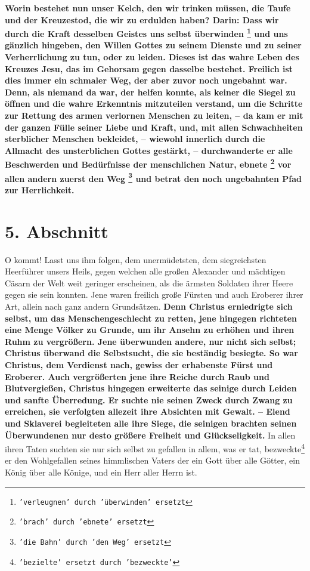 \label{ref:04_04_kelch_taufe_kreuz}
 
\textbf{Worin bestehet nun unser Kelch, den wir trinken müssen, die Taufe und
der
Kreuzestod, die wir zu erdulden haben? Darin: Dass wir durch die Kraft desselben
Geistes uns selbst überwinden \footnote{\texttt{'verleugnen' durch 'überwinden'
ersetzt}} und uns gänzlich hingeben, den Willen Gottes zu
seinem Dienste und zu seiner Verherrlichung zu tun, oder zu leiden. Dieses ist
das wahre Leben des Kreuzes Jesu, das im Gehorsam gegen dasselbe bestehet.
Freilich ist dies immer ein schmaler Weg, der aber zuvor noch ungebahnt war. Denn, als
niemand da war, der helfen konnte, als keiner die Siegel  zu
öffnen und die wahre
Erkenntnis mitzuteilen verstand, um die Schritte zur Rettung des armen
verlornen Menschen zu leiten, -- da kam er mit der ganzen Fülle seiner Liebe und
Kraft, und, mit allen Schwachheiten sterblicher Menschen bekleidet, -- wiewohl
innerlich durch die Allmacht  des unsterblichen Gottes
gestärkt, -- durchwanderte
er alle Beschwerden und Bedürfnisse der menschlichen Natur, ebnete
\footnote{\texttt{'brach' durch 'ebnete' ersetzt}} vor allen
andern zuerst den Weg \footnote{\texttt{'die Bahn' durch 'den Weg' ersetzt}} und
betrat den noch ungebahnten Pfad zur Herrlichkeit.}

\section{5. Abschnitt} \label{kap4_ab5}

\label{ref:04_05_besigen}
O kommt! Lasst uns ihm folgen, dem unermüdetsten, dem siegreichsten Heerführer
unsers Heils, gegen welchen alle großen Alexander 
und mächtigen Cäsarn der Welt 
weit geringer erscheinen, als die ärmsten Soldaten ihrer Heere
 gegen sie sein
konnten. Jene waren freilich große Fürsten und auch Eroberer
 ihrer Art, allein
nach ganz andern Grundsätzen. \textbf{Denn Christus erniedrigte sich selbst, um
das
Menschengeschlecht zu retten, jene hingegen richteten eine Menge Völker zu
Grunde, um ihr Ansehn zu erhöhen und ihren Ruhm zu vergrößern. Jene überwunden
andere, nur nicht sich selbst; Christus überwand die Selbstsucht, die sie
beständig besiegte. So war Christus, dem Verdienst nach, gewiss der erhabenste
Fürst und Eroberer. Auch vergrößerten jene ihre Reiche durch Raub und
Blutvergießen, Christus hingegen erweiterte das seinige durch Leiden und sanfte
Überredung. Er suchte nie seinen Zweck durch Zwang zu erreichen, sie verfolgten
allezeit ihre Absichten mit Gewalt. -- Elend und Sklaverei begleiteten alle ihre
Siege, die seinigen brachten seinen Überwundenen nur desto größere Freiheit und
Glückseligkeit.} In allen ihren Taten suchten sie nur sich selbst zu gefallen
in allem, was er tat, bezweckte\footnote{\texttt{'bezielte' ersetzt durch 'bezweckte'}}
er den Wohlgefallen seines himmlischen Vaters
der ein Gott über alle Götter, ein König über alle Könige, und ein Herr aller
Herrn ist.

